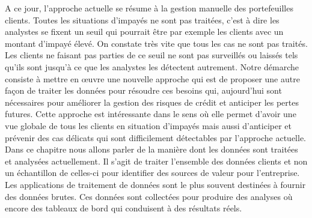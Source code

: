 \documentclass[11pt,a4paper]{report}
\begin{document}
A ce jour, l'approche actuelle se résume à la gestion manuelle des portefeuilles clients. Toutes les situations d'impayés ne sont pas traitées, c'est à dire les analystes se fixent un seuil qui pourrait être par exemple les clients avec un montant d'impayé élevé. On constate très vite que tous les cas ne sont pas traités. Les clients ne faisant pas parties de ce seuil ne sont pas surveillés ou laissés tels qu'ils sont jusqu'à ce que les analystes les détectent autrement. Notre démarche consiste à mettre en œuvre une nouvelle approche qui est de proposer une autre façon de traiter les données pour résoudre ces besoins qui, aujourd'hui sont nécessaires pour améliorer la gestion des risques de crédit et anticiper les pertes futures. Cette approche est intéressante dans le sens où elle permet d'avoir une vue globale de tous les clients en situation d'impayés mais aussi d'anticiper et prévenir des cas délicats qui sont difficilement détectables par l'approche actuelle.
 \\
%
%
%
%
%

Dans ce chapitre nous allons parler de la manière dont les données sont traitées et analysées actuellement. Il s'agit de traiter l'ensemble des données clients 
%
%
%
et non un échantillon de celles-ci pour identifier des sources de valeur pour l'entreprise. Les applications de traitement de données sont le plus souvent destinées à fournir des données brutes. Ces données sont collectées pour produire des analyses où encore des tableaux de bord qui conduisent à des résultats réels. \newline
  
\end{document}
